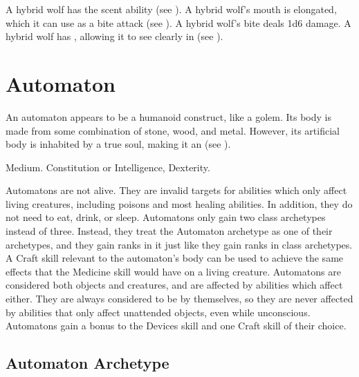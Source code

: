 
    \begin{itemize}
       A hybrid wolf has the scent ability (see ).
       A hybrid wolf's mouth is elongated, which it can use as a bite attack (see ).
        A hybrid wolf's bite deals 1d6 damage.
       A hybrid wolf has , allowing it to see clearly in  (see ).
    \end{itemize}

\section{Automaton}
  An automaton appears to be a humanoid construct, like a golem.
  Its body is made from some combination of stone, wood, and metal.
  However, its artificial body is inhabited by a true soul, making it an  (see ).

   Medium.
    Constitution or Intelligence,  Dexterity.
  \begin{itemize}
     Automatons are not alive. They are invalid targets for abilities which only affect living creatures, including poisons and most healing abilities. In addition, they do not need to eat, drink, or sleep.
     Automatons only gain two class archetypes instead of three.
      Instead, they treat the Automaton archetype as one of their archetypes, and they gain ranks in it just like they gain ranks in class archetypes.
     A Craft skill relevant to the automaton's body can be used to achieve the same effects that the Medicine skill would have on a living creature.
     Automatons are considered both objects and creatures, and are affected by abilities which affect either.
      They are always considered to be  by themselves, so they are never affected by abilities that only affect unattended objects, even while unconscious.
     Automatons gain a  bonus to the Devices skill and one Craft skill of their choice.
  \end{itemize}

  \subsection{Automaton Archetype}

